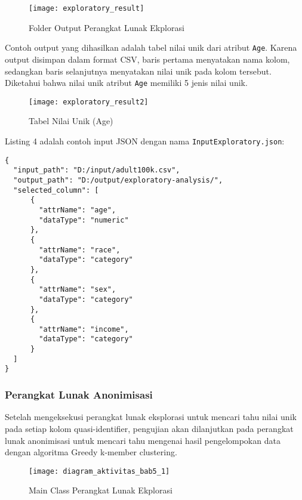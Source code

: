 \begin{figure}[H]
	\centering
	\texttt{[image: exploratory\_result]}
	\caption{Folder Output Perangkat Lunak Ekplorasi}
	\label{fig:pertama2}
\end{figure}

Contoh output yang dihasilkan adalah tabel nilai unik dari atribut \texttt{Age}. Karena output disimpan dalam format CSV, baris pertama menyatakan nama kolom, sedangkan baris selanjutnya menyatakan nilai unik pada kolom tersebut.  Diketahui bahwa nilai unik atribut \texttt{Age} memiliki 5 jenis nilai unik.

\begin{figure}[H]
	\centering
	\texttt{[image: exploratory\_result2]}
	\caption{Tabel Nilai Unik (Age)}
	\label{fig:pertama2}
\end{figure}

\noindent Listing 4 adalah contoh input JSON dengan nama \texttt{InputExploratory.json}:

\begin{lstlisting}[basicstyle=\ttfamily, frame=single,
	columns=fullflexible, keepspaces=true, breaklines=true, label=lst:pl_csv, caption=Data JSON untuk Perangkat Lunak Eksplorasi]
{
  "input_path": "D:/input/adult100k.csv",
  "output_path": "D:/output/exploratory-analysis/",
  "selected_column": [
      {
        "attrName": "age",
        "dataType": "numeric"
      },
      {
        "attrName": "race",
        "dataType": "category"
      },
      {
        "attrName": "sex",
        "dataType": "category"
      },
      {
        "attrName": "income",
        "dataType": "category"
      }
  ]
}
\end{lstlisting}

\subsubsection{Perangkat Lunak Anonimisasi}

Setelah mengeksekusi perangkat lunak eksplorasi untuk mencari tahu nilai unik pada setiap kolom quasi-identifier, pengujian akan dilanjutkan pada perangkat lunak anonimisasi untuk mencari tahu mengenai hasil pengelompokan data dengan algoritma Greedy k-member clustering.

\begin{figure}[H]
	\centering
	\texttt{[image: diagram\_aktivitas\_bab5\_1]}
	\caption{Main Class Perangkat Lunak Ekplorasi}
	\label{fig:pertama1}
\end{figure}

